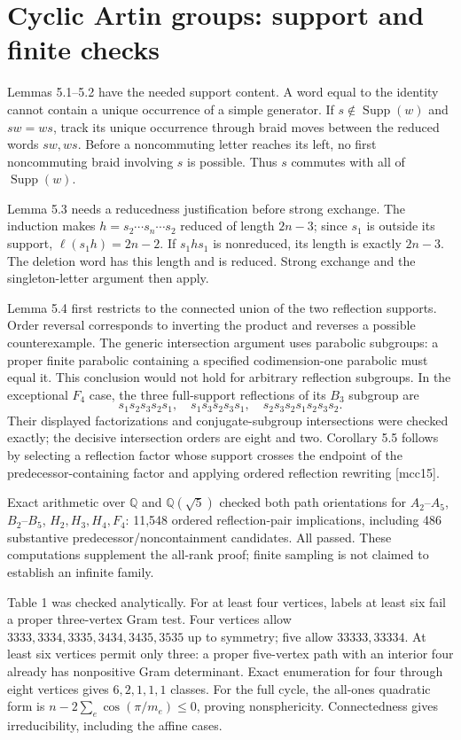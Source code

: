 \documentclass[10pt]{article}
\begin{document}
\section*{Cyclic Artin groups: support and finite checks}
Lemmas 5.1–5.2 have the needed support content. A word equal to the identity cannot contain a unique occurrence of a simple generator. If \(s\notin\operatorname{Supp}(w)\) and \(sw=ws\), track its unique occurrence through braid moves between the reduced words \(sw,ws\). Before a noncommuting letter reaches its left, no first noncommuting braid involving \(s\) is possible. Thus \(s\) commutes with all of \(\operatorname{Supp}(w)\).\par
Lemma 5.3 needs a reducedness justification before strong exchange. The induction makes \(h=s_2\cdots s_n\cdots s_2\) reduced of length \(2n-3\); since \(s_1\) is outside its support, \(\ell(s_1h)=2n-2\). If \(s_1hs_1\) is nonreduced, its length is exactly \(2n-3\). The deletion word has this length and is reduced. Strong exchange and the singleton-letter argument then apply.\par
Lemma 5.4 first restricts to the connected union of the two reflection supports. Order reversal corresponds to inverting the product and reverses a possible counterexample. The generic intersection argument uses parabolic subgroups: a proper finite parabolic containing a specified codimension-one parabolic must equal it. This conclusion would not hold for arbitrary reflection subgroups. In the exceptional \(F_4\) case, the three full-support reflections of its \(B_3\) subgroup are \[s_1s_2s_3s_2s_1,\quad s_1s_3s_2s_3s_1,\quad
 s_2s_3s_2s_1s_2s_3s_2.\] Their displayed factorizations and conjugate-subgroup intersections were checked exactly; the decisive intersection orders are eight and two. Corollary 5.5 follows by selecting a reflection factor whose support crosses the endpoint of the predecessor-containing factor and applying ordered reflection rewriting [mcc15].\par
Exact arithmetic over \(\mathbb Q\) and \(\mathbb Q(\sqrt5)\) checked both path orientations for \(A_2\)–\(A_5\), \(B_2\)–\(B_5\), \(H_2,H_3,H_4,F_4\): 11,548 ordered reflection-pair implications, including 486 substantive predecessor/noncontainment candidates. All passed. These computations supplement the all-rank proof; finite sampling is not claimed to establish an infinite family.\par
Table 1 was checked analytically. For at least four vertices, labels at least six fail a proper three-vertex Gram test. Four vertices allow \(3333,3334,3335,3434,3435,3535\) up to symmetry; five allow \(33333,33334\). At least six vertices permit only three: a proper five-vertex path with an interior four already has nonpositive Gram determinant. Exact enumeration for four through eight vertices gives \(6,2,1,1,1\) classes. For the full cycle, the all-ones quadratic form is \(n-2\sum_e\cos(\pi/m_e)\le0\), proving nonsphericity. Connectedness gives irreducibility, including the affine cases.\par
\end{document}
